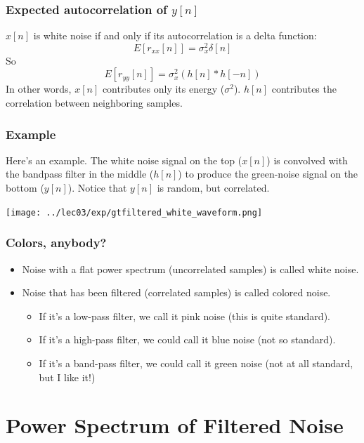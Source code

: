 \documentclass{beamer}
\begin{document}
\begin{frame}
  \frametitle{Expected autocorrelation of $y[n]$}
  
  $x[n]$ is white noise if and  only if its autocorrelation is a delta function:
  \[
  E\left[r_{xx}[n]\right] = \sigma_x^2 \delta[n]
  \]
  So
  \[
  E\left[r_{yy}[n]\right] = \sigma_x^2 \left(h[n]\ast h[-n]\right)
  \]
  In other words, $x[n]$ contributes only its energy ($\sigma^2$).  $h[n]$ contributes the
  correlation between neighboring  samples.
\end{frame}

\begin{frame}
  \frametitle{Example}

  Here's an example.  The white noise signal on the top ($x[n]$) is
  convolved with the bandpass filter in the middle ($h[n]$) to produce
  the green-noise signal on the bottom ($y[n]$).  Notice that $y[n]$
  is random, but correlated.
  
  \centerline{\texttt{[image: ../lec03/exp/gtfiltered\_white\_waveform.png]}}
\end{frame}

\begin{frame}
  \frametitle{Colors, anybody?}

  \begin{itemize}
    \item Noise with a flat power spectrum (uncorrelated samples) is
      called white noise.
    \item Noise that has been filtered (correlated samples) is called
      colored noise.
      \begin{itemize}
      \item If it's a low-pass filter, we call it pink noise (this is
        quite standard).
      \item If it's a high-pass filter, we could call it blue noise
        (not so standard).
      \item If it's a band-pass filter, we could call it green noise
        (not at all standard, but I like it!)
      \end{itemize}
  \end{itemize}
\end{frame}

\section[Spectrum]{Power Spectrum of Filtered Noise}
\setcounter{subsection}{1}
\end{document}
